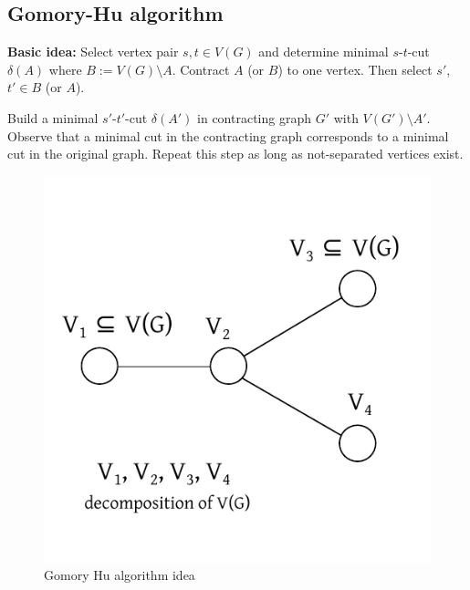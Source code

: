 \documentclass{article}
\begin{document}
\subsection{Gomory-Hu algorithm}
\textbf{Basic idea:}
  Select vertex pair $s, t \in V(G)$ and determine minimal $s$-$t$-cut $\delta(A)$ where $B := V(G) \setminus A$. Contract $A$ (or $B$) to one vertex. Then select $s'$, $t' \in B$ (or $A$).

  Build a minimal $s'$-$t'$-cut $\delta(A')$ in contracting graph $G'$ with $V(G') \setminus A'$. Observe that a minimal cut in the contracting graph corresponds to a minimal cut in the original graph. Repeat this step as long as not-separated vertices exist.

\begin{figure}[ht]
 \begin{center}
  \includegraphics{img/gomory_hu_algo_idea.pdf}
  \caption{Gomory Hu algorithm idea}
 \end{center}
\end{figure}
\end{document}
